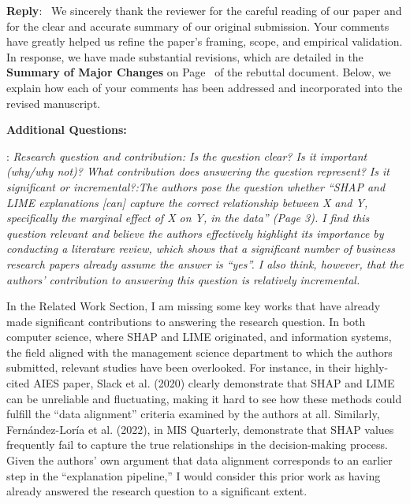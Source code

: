 \documentclass[11pt]{article}
\newcounter{se}[section]
\newcounter{reviewer}
\newcounter{point}[reviewer]
\renewcommand{\thepoint}{R\,\thereviewer.\arabic{point}}
\newenvironment{point}{
    \refstepcounter{point} \bigskip \noindent {\textbf{\thepoint}}: \rmfamily \itshape
}{\medskip}
\newenvironment{reply}
 {\par\medskip \noindent \begin{sf}\textbf{Reply}:\ }
 {\medskip \end{sf}}
\begin{document}
\begin{reply}
We sincerely thank the reviewer for the careful reading of our paper and for the clear and accurate summary of our original submission. Your comments have greatly helped us refine the paper’s framing, scope, and empirical validation. In response, we have made substantial revisions, which are detailed in the \textbf{Summary of Major Changes} on Page~\pageref{sec:majorchanges} of the rebuttal document. Below, we explain how each of your comments has been addressed and incorporated into the revised manuscript.
\end{reply}

\noindent \textbf{Additional Questions:}

\begin{point}\label{q:research_question}
Research question and contribution: Is the question clear? Is it important (why/why not)? What contribution does answering the question represent? Is it significant or incremental?:The authors pose the question whether “SHAP and LIME explanations [can] capture the correct relationship between X and Y, specifically the marginal effect of X on Y, in the data” (Page 3). I find this question relevant and believe the authors effectively highlight its importance by conducting a literature review, which shows that a significant number of business research papers already assume the answer is “yes”. I also think, however, that the authors' contribution to answering this question is relatively incremental.

In the Related Work Section, I am missing some key works that have already made significant contributions to answering the research question. In both computer science, where SHAP and LIME originated, and information systems, the field aligned with the management science department to which the authors submitted, relevant studies have been overlooked. For instance, in their highly-cited AIES paper, Slack et al. (2020) clearly demonstrate that SHAP and LIME can be unreliable and fluctuating, making it hard to see how these methods could fulfill the “data alignment” criteria examined by the authors at all. Similarly, Fernández-Loría et al. (2022), in MIS Quarterly, demonstrate that SHAP values frequently fail to capture the true relationships in the decision-making process. Given the authors' own argument that data alignment corresponds to an earlier step in the “explanation pipeline,” I would consider this prior work as having already answered the research question to a significant extent.
\end{point}
\end{document}
